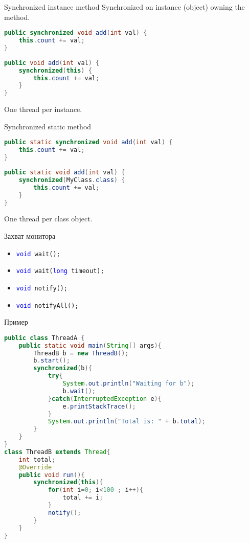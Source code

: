 \begin{frame}[fragile]{Synchronized instance method}
Synchronized on instance (object) owning the method.
\vfill
\begin{lstlisting}[language=Java]
public synchronized void add(int val) {
    this.count += val;
}
\end{lstlisting}
\vfill
\begin{lstlisting}[language=Java]
public void add(int val) {
    synchronized(this) {
        this.count += val;
    }
}
\end{lstlisting}
\vfill
One thread per instance.
\end{frame}

\begin{frame}[fragile]{Synchronized static method}
\begin{lstlisting}[language=Java]
public static synchronized void add(int val) {
    this.count += val;
}
\end{lstlisting}
\vfill
\begin{lstlisting}[language=Java]
public static void add(int val) {
    synchronized(MyClass.class) {
        this.count += val;
    }
}
\end{lstlisting}
\vfill
One thread per class object.
\end{frame}

\begin{frame}{Захват монитора}
\begin{itemize}
    \item \texttt{\textcolor{blue}{void} wait();}
    \item \texttt{\textcolor{blue}{void} wait(\textcolor{blue}{long} timeout);}
    \item \texttt{\textcolor{blue}{void} notify();}
    \item \texttt{\textcolor{blue}{void} notifyAll();}
\end{itemize}
\end{frame}

\begin{frame}[fragile]{Пример}
\begin{lstlisting}[basicstyle=\tiny, language=Java]
public class ThreadA {
    public static void main(String[] args){
        ThreadB b = new ThreadB();
        b.start();
        synchronized(b){
            try{
                System.out.println("Waiting for b");
                b.wait();
            }catch(InterruptedException e){
                e.printStackTrace();
            }
            System.out.println("Total is: " + b.total);
        }
    }
}
class ThreadB extends Thread{
    int total;
    @Override
    public void run(){
        synchronized(this){
            for(int i=0; i<100 ; i++){
                total += i;
            }
            notify();
        }
    }
}
\end{lstlisting}
\end{frame}

